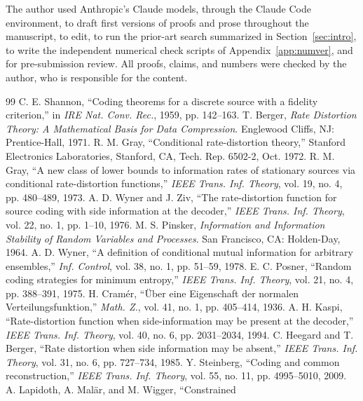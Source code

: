 \documentclass[11pt,onecolumn]{IEEEtran}
\begin{document}
The author used Anthropic's Claude models, through the Claude Code
environment, to draft first versions of proofs and prose throughout the
manuscript, to edit, to run the prior-art search summarized in
Section~\ref{sec:intro}, to write the independent numerical check scripts
of Appendix~\ref{app:numver}, and for pre-submission review. All proofs,
claims, and numbers were checked by the author, who is responsible for
the content.

\begin{thebibliography}{99}
 C. E. Shannon, ``Coding theorems for a discrete source
with a fidelity criterion,'' in \emph{IRE Nat. Conv. Rec.}, 1959, pp. 142--163.
 T. Berger, \emph{Rate Distortion Theory: A Mathematical
Basis for Data Compression}. Englewood Cliffs, NJ: Prentice-Hall, 1971.
 R. M. Gray, ``Conditional rate-distortion theory,''
Stanford Electronics Laboratories, Stanford, CA, Tech. Rep. 6502-2, Oct. 1972.
 R. M. Gray, ``A new class of lower bounds to information
rates of stationary sources via conditional rate-distortion functions,''
\emph{IEEE Trans. Inf. Theory}, vol. 19, no. 4, pp. 480--489, 1973.
 A. D. Wyner and J. Ziv, ``The rate-distortion function
for source coding with side information at the decoder,'' \emph{IEEE Trans.
Inf. Theory}, vol. 22, no. 1, pp. 1--10, 1976.
 M. S. Pinsker, \emph{Information and Information
Stability of Random Variables and Processes}. San Francisco, CA:
Holden-Day, 1964.
 A. D. Wyner, ``A definition of conditional mutual
information for arbitrary ensembles,'' \emph{Inf. Control}, vol. 38,
no. 1, pp. 51--59, 1978. %
 E. C. Posner, ``Random coding strategies for minimum
entropy,'' \emph{IEEE Trans. Inf. Theory}, vol. 21, no. 4, pp. 388--391,
1975.
 H. Cram\'er, ``\"Uber eine Eigenschaft der normalen
Verteilungsfunktion,'' \emph{Math. Z.}, vol. 41, no. 1, pp. 405--414,
1936.
 A. H. Kaspi, ``Rate-distortion function when
side-information may be present at the decoder,'' \emph{IEEE Trans. Inf.
Theory}, vol. 40, no. 6, pp. 2031--2034, 1994.
 C. Heegard and T. Berger, ``Rate distortion when
side information may be absent,'' \emph{IEEE Trans. Inf. Theory}, vol. 31,
no. 6, pp. 727--734, 1985.
 Y. Steinberg, ``Coding and common reconstruction,''
\emph{IEEE Trans. Inf. Theory}, vol. 55, no. 11, pp. 4995--5010, 2009.
 A. Lapidoth, A. Mal\"ar, and M. Wigger, ``Constrained

\end{thebibliography}
\end{document}
